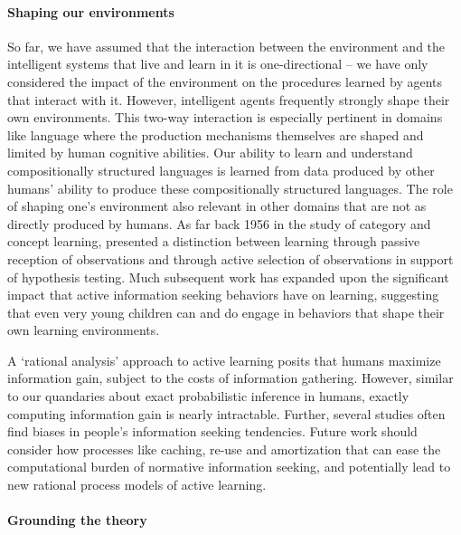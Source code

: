 \paragraph{Shaping our environments}

So far, we have assumed that the interaction between the environment and the intelligent systems that live and learn in it is one-directional -- we have only considered the impact of the environment on the procedures learned by agents that interact with it. However, intelligent agents frequently strongly shape their own environments. This two-way interaction is especially pertinent in domains like language where the production mechanisms themselves are shaped and limited by human cognitive abilities. Our ability to learn and understand compositionally structured languages is learned from data produced by other humans' ability to produce these compositionally structured languages. The role of shaping one's environment also relevant in other domains that are not as directly produced by humans. As far back 1956 in the study of category and concept learning, \citet{bruner2017study} presented a distinction between learning through passive reception of observations and through active selection of observations in support of hypothesis testing. Much subsequent work has expanded upon the significant impact that active information seeking behaviors have on learning\citep{nelson2005finding,markant2014better, gureckis2012self}, suggesting that even very young children can and do engage in behaviors that shape their own learning environments\citep{ruggeri2017toma, gopnik1996scientist, montessori1912montessori}. 

A `rational analysis' approach to active learning posits that humans maximize information gain, subject to the costs of information gathering. However, similar to our quandaries about exact probabilistic inference in humans, exactly computing information gain is nearly intractable. Further, several studies often find biases in people's information seeking tendencies\citep{jonas2001confirmation, beattie1988confirmation}. Future work should consider how processes like caching, re-use and amortization that can ease the computational burden of normative information seeking, and potentially lead to new rational process models of active learning.


\paragraph{Grounding the theory}

